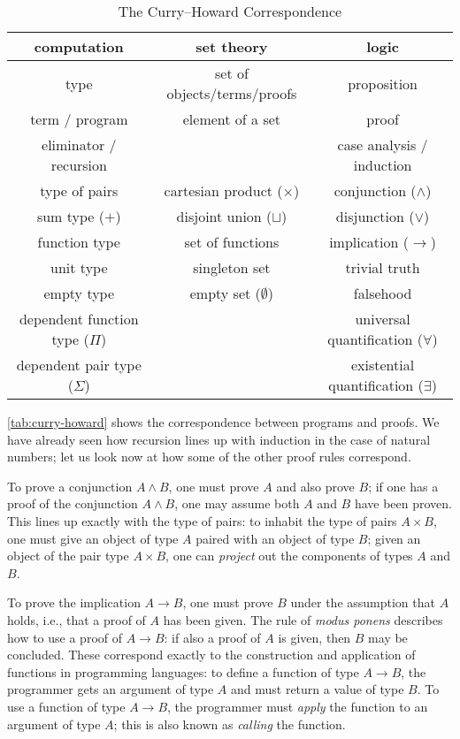 \begin{table}[t]
\centering
\begin{tabular}{c|c|c}
computation & set theory & logic \\ \hline
type & set of objects/terms/proofs & proposition \\
term / program & element of a set & proof \\
eliminator / recursion & & case analysis / induction \\
type of pairs & cartesian product ($\times$) & conjunction ($\wedge$) \\
sum type ($+$) & disjoint union ($\sqcup$) & disjunction ($\vee$) \\
function type & set of functions & implication ($\to$) \\
unit type & singleton set & trivial truth \\
empty type & empty set ($\emptyset$) & falsehood \\
dependent function type ($\Pi$) & & universal quantification ($\forall$) \\
dependent pair type ($\Sigma$) & & existential quantification ($\exists$)
\end{tabular}
\caption{The Curry--Howard Correspondence}
\label{tab:curry-howard}
\end{table}

\autoref{tab:curry-howard} shows the correspondence between programs and proofs.
We have already seen how recursion lines up with induction in the case of natural numbers; let us look now at how some of the other proof rules correspond.

To prove a conjunction $A \wedge B$, one must prove $A$ and also prove $B$; if one has a proof of the conjunction $A \wedge B$, one may assume both $A$ and $B$ have been proven.
This lines up exactly with the type of pairs: to inhabit the type of pairs $A \times B$, one must give an object of type $A$ paired with an object of type $B$; given an object of the pair type $A \times B$, one can \emph{project} out the components of types $A$ and $B$.

To prove the implication $A \to B$, one must prove $B$ under the assumption that $A$ holds, i.e., that a proof of $A$ has been given.
The rule of \emph{modus ponens} describes how to use a proof of $A \to B$: if also a proof of $A$ is given, then $B$ may be concluded.
These correspond exactly to the construction and application of functions in programming languages:
to define a function of type $A \to B$, the programmer gets an argument of type $A$ and must return a value of type $B$.
To use a function of type $A \to B$, the programmer must \emph{apply} the function to an argument of type $A$; this is also known as \emph{calling} the function.

